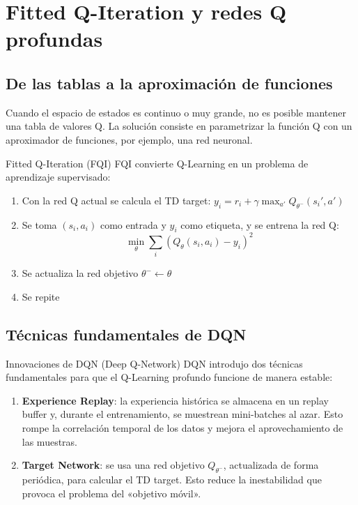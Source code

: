 \section{Fitted Q-Iteration y redes Q profundas}

\subsection{De las tablas a la aproximación de funciones}

Cuando el espacio de estados es continuo o muy grande, no es posible mantener una tabla de valores Q. La solución consiste en parametrizar la función Q con un aproximador de funciones, por ejemplo, una red neuronal.

\begin{importantbox}{Fitted Q-Iteration (FQI)}
FQI convierte Q-Learning en un problema de aprendizaje supervisado:
\begin{enumerate}
    \item Con la red Q actual se calcula el TD target: $y_i = r_i + \gamma \max_{a'} Q_{\theta^-}(s_i', a')$
    \item Se toma $(s_i, a_i)$ como entrada y $y_i$ como etiqueta, y se entrena la red Q:
    $$\min_\theta \sum_i \left(Q_\theta(s_i, a_i) - y_i\right)^2$$
    \item Se actualiza la red objetivo $\theta^- \leftarrow \theta$
    \item Se repite
\end{enumerate}
\end{importantbox}

\subsection{Técnicas fundamentales de DQN}

\begin{importantbox}{Innovaciones de DQN (Deep Q-Network)}
DQN introdujo dos técnicas fundamentales para que el Q-Learning profundo funcione de manera estable:
\begin{enumerate}
    \item \textbf{Experience Replay}: la experiencia histórica se almacena en un replay buffer y, durante el entrenamiento, se muestrean mini-batches al azar. Esto rompe la correlación temporal de los datos y mejora el aprovechamiento de las muestras.
    \item \textbf{Target Network}: se usa una red objetivo $Q_{\theta^-}$, actualizada de forma periódica, para calcular el TD target. Esto reduce la inestabilidad que provoca el problema del «objetivo móvil».
\end{enumerate}
\end{importantbox}

